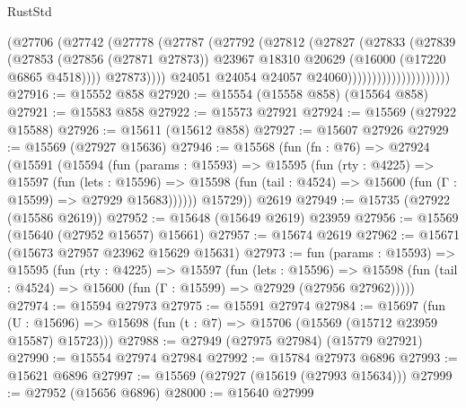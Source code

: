 \begin{lexlean}{RustStd}
\begin{coremodule}
                                      (@27706
                                        (@27742
                                          (@27778
                                            (@27787
                                              (@27792
                                                (@27812
                                                  (@27827
                                                    (@27833
                                                      (@27839
                                                        (@27853
                                                          (@27856 (@27871 @27873))
                                                          @23967
                                                          @18310
                                                          @20629
                                                          (@16000 (@17220 @6865 @4518))))
                                                      @27873))))
                                              @24051
                                              @24054
                                              @24057
                                              @24060)))))))))))))))))))))
@27916 := @15552 @858
@27920 := @15554 (@15558 @858) (@15564 @858)
@27921 := @15583 @858
@27922 := @15573 @27921
@27924 := @15569 (@27922 @15588)
@27926 := @15611 (@15612 @858)
@27927 := @15607 @27926
@27929 := @15569 (@27927 @15636)
@27946 := @15568
    (fun (fn : @76) =>
    @27924
      (@15591
        (@15594
          (fun (params : @15593) =>
          @15595
            (fun (rty : @4225) =>
            @15597
              (fun (lets : @15596) =>
              @15598 (fun (tail : @4524) => @15600 (fun (Γ : @15599) => @27929 @15683))))))
        @15729))
    @2619
@27949 := @15735 (@27922 (@15586 @2619))
@27952 := @15648 (@15649 @2619) @23959
@27956 := @15569 (@15640 (@27952 @15657) @15661)
@27957 := @15674 @2619
@27962 := @15671 (@15673 @27957 @23962 @15629 @15631)
@27973 := fun (params : @15593) =>
  @15595
    (fun (rty : @4225) =>
    @15597
      (fun (lets : @15596) =>
      @15598 (fun (tail : @4524) => @15600 (fun (Γ : @15599) => @27929 (@27956 @27962)))))
@27974 := @15594 @27973
@27975 := @15591 @27974
@27984 := @15697
    (fun (U : @15696) => @15698 (fun (t : @7) => @15706 (@15569 (@15712 @23959 @15587) @15723)))
@27988 := @27949 (@27975 @27984) (@15779 @27921)
@27990 := @15554 @27974 @27984
@27992 := @15784 @27973 @6896
@27993 := @15621 @6896
@27997 := @15569 (@27927 (@15619 (@27993 @15634)))
@27999 := @27952 (@15656 @6896)
@28000 := @15640 @27999

\end{coremodule}
\end{lexlean}
